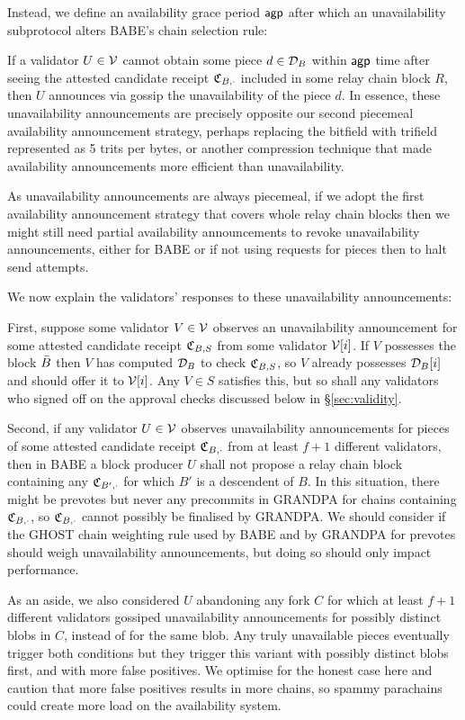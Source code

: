 Instead, we define an availability grace period $\mathsf{agp}$ after which an unavailability subprotocol alters BABE's chain selection rule:  

If a validator $U \in \mathcal{V}$ cannot obtain some piece $d \in \mathcal{D}_B$ within $\mathsf{agp}$ time after seeing the attested candidate receipt $\mathfrak{C}_{B,\cdot}$ included in some relay chain block $R$, then $U$ announces via gossip the unavailability of the piece $d$. 
In essence, these unavailability announcements are precisely opposite our second piecemeal availability announcement strategy, perhaps replacing the bitfield with trifield represented as 5 trits per bytes, or another compression technique that made availability announcements more efficient than unavailability.

As unavailability announcements are always piecemeal, if we adopt the first availability announcement strategy that covers whole relay chain blocks then we might still need partial availability announcements to revoke unavailability announcements, either for BABE or if not using requests for pieces then to halt send attempts.

We now explain the validators' responses to these unavailability announcements:

First, suppose some validator $V \in \mathcal{V}$ observes an unavailability announcement for some attested candidate receipt $\mathfrak{C}_{B,S}$ from some validator $\mathcal{V}[i]$.  If $V$ possesses the block $\bar{B}$ then $V$ has computed $\mathcal{D}_B$ to check $\mathfrak{C}_{B,S}$, so $V$ already possesses $\mathcal{D}_B[i]$ and should offer it to $\mathcal{V}[i]$.  Any $V \in S$ satisfies this, but so shall any validators who signed off on the approval checks discussed below in \S\ref{sec:validity}. 

Second, if any validator $U \in \mathcal{V}$ observes unavailability announcements for pieces of some attested candidate receipt $\mathfrak{C}_{B,\cdot}$ from at least $f+1$ different validators, then in BABE a block producer $U$ shall not propose a relay chain block containing any $\mathfrak{C}_{B',\cdot}$ for which $B'$ is a descendent of $B$.
In this situation, there might be prevotes but never any precommits in GRANDPA for chains containing  $\mathfrak{C}_{B,\cdot}$, so $\mathfrak{C}_{B,\cdot}$ cannot possibly be finalised by GRANDPA.  We should consider if the GHOST chain weighting rule used by BABE and by GRANDPA for prevotes should weigh unavailability announcements, but doing so should only impact performance.

As an aside, we also considered $U$ abandoning any fork $C$ for which at least $f+1$ different validators gossiped unavailability announcements for possibly distinct blobs in $C$, instead of for the same blob.  Any truly unavailable pieces eventually trigger both conditions but they trigger this variant with possibly distinct blobs first, and with more false positives.  We optimise for the honest case here and caution that more false positives results in more chains, so spammy parachains could create more load on the availability system.


